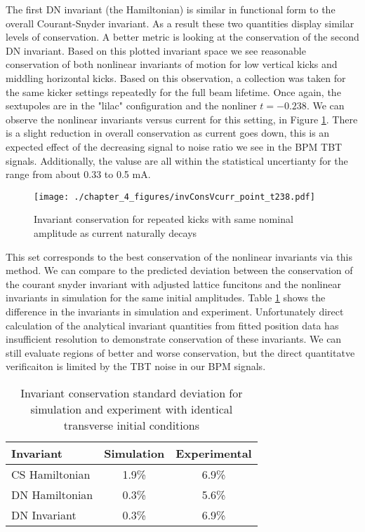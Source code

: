 The first DN invariant (the Hamiltonian) is similar in functional form to the overall Courant-Snyder invariant. As a result these two quantities display similar levels of conservation. A better metric is looking at the conservation of the second DN invariant. Based on this plotted invariant space we see reasonable conservation of both nonlinear invariants of motion for low vertical kicks and middling horizontal kicks. Based on this observation, a collection was taken for the same kicker settings repeatedly for the full beam lifetime. Once again, the sextupoles are in the "lilac" configuration and the nonliner $t=-0.238$. We can observe the nonlinear invariants versus current for this setting, in Figure \ref{fig:pointCurrent}. There is a slight reduction in overall conservation as current goes down, this is an expected effect of the decreasing signal to noise ratio we see in the BPM TBT signals. Additionally, the valuse are all within the statistical uncertianty for the range from about 0.33 to 0.5 mA.

\begin{figure}
	\centering
	\texttt{[image: ./chapter\_4\_figures/invConsVcurr\_point\_t238.pdf]}
	\caption{Invariant conservation for repeated kicks with same nominal amplitude as current naturally decays}
	\label{fig:pointCurrent}
\end{figure}

This set corresponds to the best conservation of the nonlinear invariants via this method. We can compare to the predicted deviation between the conservation of the courant snyder invariant with adjusted lattice funcitons and the nonlinear invariants in simulation for the same initial amplitudes. Table \ref{tab:invConsv} shows the difference in the invariants in simulation and experiment. Unfortunately direct calculation of the analytical invariant quantities from fitted position data has insufficient resolution to demonstrate conservation of these invariants. We can still evaluate regions of better and worse conservation, but the direct quantitatve verificaiton is limited by the TBT noise in our BPM signals.

\begin{table}
    \centering
    \begin{tabular}{lcc}
        \toprule
        \textbf{Invariant} & \textbf{Simulation} & \textbf{Experimental}\\
        \midrule
        CS Hamiltonian & 1.9\% & 6.9\% \\
        DN Hamiltonian & 0.3\% & 5.6\% \\
        DN Invariant & 0.3\% & 6.9\% \\
        \bottomrule
    \end{tabular}
    \caption{Invariant conservation standard deviation for simulation and experiment with identical transverse initial conditions}
    \label{tab:invConsv}
\end{table}


